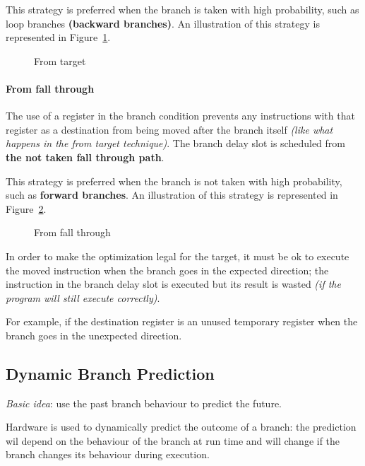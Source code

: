\documentclass[english]{article}
\begin{document}
This strategy is preferred when the branch is taken with high probability, such as loop branches \textbf{(backward branches)}.
An illustration of this strategy is represented in Figure~\ref{fig:from-target}.

\begin{figure}[htbp]
  \bigskip
  \centering
  \caption{From target}
  \label{fig:from-target}
  \bigskip
\end{figure}

\paragraph{From fall through}

The use of a register in the branch condition prevents any instructions with that register as a destination from being moved after the branch itself \textit{(like what happens in the from target technique)}.
The branch delay slot is scheduled from \textbf{the not taken fall through path}.

This strategy is preferred when the branch is not taken with high probability, such as \textbf{forward branches}.
An illustration of this strategy is represented in Figure~\ref{fig:from-fall-through}.

\begin{figure}[htbp]
  \bigskip
  \centering
  \caption{From fall through}
  \label{fig:from-fall-through}
  \bigskip
\end{figure}

In order to make the optimization legal for the target, it must be ok to execute the moved instruction when the branch goes in the expected direction;
the instruction in the branch delay slot is executed but its result is wasted \textit{(if the program will still execute correctly)}.

For example, if the destination register is an unused temporary register when the branch goes in the unexpected direction.

\subsection{Dynamic Branch Prediction}
\label{sec:dynamic-branch-prediction}

\textit{Basic idea}: use the past branch behaviour to predict the future.

Hardware is used to dynamically predict the outcome of a branch: the prediction wil depend on the behaviour of the branch at run time and will change if the branch changes its behaviour during execution.
\end{document}
